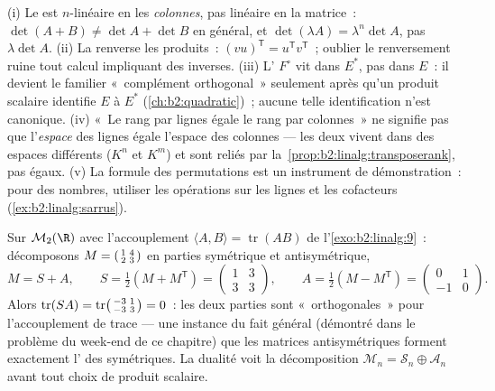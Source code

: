 \begin{remark}\label{rem:b2:linalg:pitfalls}
(i) Le  est $n$-linéaire en les \emph{colonnes}, pas
linéaire en la matrice~: $\det(A + B) \neq \det A + \det B$ en
général, et $\det(\lambda A) = \lambda^n\det A$, pas
$\lambda\det A$. (ii) La  renverse les produits~:
$(vu)^{\mathsf T} = u^{\mathsf T}v^{\mathsf T}$~; oublier le
renversement ruine tout calcul impliquant des inverses. (iii)
L' $F^\circ$ vit dans $E^*$, pas dans $E$~: il devient le
familier «~complément orthogonal~» seulement après qu'un produit
scalaire identifie $E$ à $E^*$ (\cref{ch:b2:quadratic})~; aucune telle
identification n'est canonique. (iv) «~Le rang par lignes égale le
rang par colonnes~» ne signifie pas que l'\emph{espace} des lignes égale
l'espace des colonnes --- les deux vivent dans des espaces différents
($K^n$ et $K^m$) et sont reliés par la~\cref{prop:b2:linalg:transposerank},
pas égaux. (v) La formule des permutations est un instrument de
démonstration~: pour des nombres, utiliser les opérations sur les
lignes et les cofacteurs (\cref{ex:b2:linalg:sarrus}).
\end{remark}

\begin{example}\label{ex:b2:linalg:tracepairing}
Sur $\mathcal{M}_2(\R)$ avec l'accouplement $\langle A, B\rangle =
\operatorname{tr}(AB)$ de l'\cref{exo:b2:linalg:9}~: décomposons $M =
\begin{psmallmatrix}1 & 4\\ 2 & 3\end{psmallmatrix}$ en parties
symétrique et antisymétrique,
\[
M = S + A, \qquad
S = \tfrac12(M + M^{\mathsf T}) =
\begin{pmatrix}1 & 3\\ 3 & 3\end{pmatrix},
\qquad
A = \tfrac12(M - M^{\mathsf T}) =
\begin{pmatrix}0 & 1\\ -1 & 0\end{pmatrix}.
\]
Alors $\operatorname{tr}(SA) = \operatorname{tr}
\begin{psmallmatrix}-3 & 1\\ -3 & 3\end{psmallmatrix} = 0$~: les
deux parties sont «~orthogonales~» pour l'accouplement de trace ---
une instance du fait général (démontré dans le problème du week-end
de ce chapitre) que les matrices antisymétriques forment exactement
l' des symétriques. La dualité voit la décomposition
$\mathcal{M}_n = \mathcal{S}_n \oplus
\mathcal{A}_n$ avant tout choix de produit scalaire.
\end{example}

